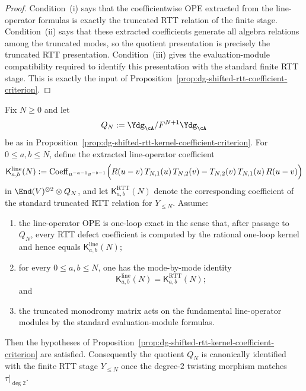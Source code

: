 \begin{proof}
Condition~\textup{(i)} says that the coefficientwise OPE extracted from
the line-operator formulas is exactly the truncated RTT relation of the
finite stage.  Condition~\textup{(ii)} says that these extracted
coefficients generate all algebra relations among the truncated modes,
so the quotient presentation is precisely the truncated RTT
presentation.  Condition~\textup{(iii)} gives the evaluation-module
compatibility required to identify this presentation with the standard
finite RTT stage.  This is exactly the input of
Proposition~\ref{prop:dg-shifted-rtt-coefficient-criterion}.
\end{proof}

\begin{proposition}
\label{prop:dg-shifted-rtt-oneloop-kernel-criterion}
Fix $N \ge 0$ and let
\[
Q_N:=\Ydg_{\cA}/F^{N+1}\Ydg_{\cA}
\]
be as in
Proposition~\ref{prop:dg-shifted-rtt-kernel-coefficient-criterion}.
For $0 \le a,b \le N$, define the extracted line-operator coefficient
\[
\mathsf{K}^{\mathrm{line}}_{a,b}(N):=
\operatorname{Coeff}_{u^{-a-1}v^{-b-1}}
\Bigl(
R(u-v)\,T_{N,1}(u)\,T_{N,2}(v)
-T_{N,2}(v)\,T_{N,1}(u)\,R(u-v)
\Bigr)
\]
in $\End(V)^{\otimes 2}\otimes Q_N$, and let
$\mathsf{K}^{\mathrm{RTT}}_{a,b}(N)$ denote the corresponding
coefficient of the standard truncated RTT relation for $Y_{\le N}$.
Assume:
\begin{enumerate}[label=\textup{(\roman*)}]
\item the line-operator OPE is one-loop exact in the sense that, after
  passage to $Q_N$, every RTT defect coefficient is computed by the
  rational one-loop kernel and hence equals
  $\mathsf{K}^{\mathrm{line}}_{a,b}(N)$;
\item for every $0 \le a,b \le N$, one has the mode-by-mode identity
  \[
  \mathsf{K}^{\mathrm{line}}_{a,b}(N)
  = \mathsf{K}^{\mathrm{RTT}}_{a,b}(N);
  \]
  and
\item the truncated monodromy matrix acts on the fundamental
  line-operator modules by the standard evaluation-module formulas.
\end{enumerate}
Then the hypotheses of
Proposition~\ref{prop:dg-shifted-rtt-kernel-coefficient-criterion} are
satisfied.  Consequently the quotient $Q_N$ is canonically identified
with the finite RTT stage $Y_{\le N}$ once the degree-$2$ twisting
morphism matches $\tau|_{\deg 2}$.
\end{proposition}


